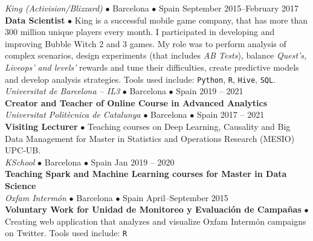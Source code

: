 \documentclass[a4paper, oneside]{scrreprt}
\begin{document}
\vspace{-0.3cm}
\noindent{}
\hspace{-0.15cm}\textit{King (Activision/Blizzard)} $\bullet$ 
Barcelona $\bullet$ Spain \hfill September 2015--February 2017\\
\noindent\textbf{\small Data Scientist } $\bullet$ 
{\small King is a successful mobile game company, that has more
  than 300 million unique players every month. I participated in developing and
  improving Bubble Witch 2 and 3 games. My
  role was to perform analysis of complex scenarios,
  design experiments (that includes \textit{AB Tests}),
  balance \textit{Quest's, Liveops' and levels'}
  rewards and tune their difficulties,
  create predictive models and develop analysis strategies.
  Tools used include: \texttt{Python}, \texttt{R}, \texttt{Hive}, \texttt{SQL}. }\\

\vspace{-0.3cm}
\noindent{}\textit{Universitat de Barcelona -- IL3} $\bullet$ 
Barcelona $\bullet$ Spain \hfill 2019 -- 2021\\
\noindent\textbf{\small Creator and Teacher of Online Course in Advanced Analytics} \\

\vspace{-0.3cm}
\noindent{}\textit{Universitat Politècnica de Catalunya} $\bullet$ 
Barcelona $\bullet$ Spain \hfill 2017 -- 2021\\
\noindent\textbf{\small Visiting Lecturer} $\bullet$ Teaching courses on Deep Learning, Causality and
Big Data Management for Master in Statistics and Operations Research (MESIO) UPC-UB. \\

\vspace{-0.3cm}
\noindent{}\textit{KSchool} $\bullet$ 
Barcelona $\bullet$ Spain \hfill Jan 2019 -- 2020\\
\noindent\textbf{\small Teaching Spark and Machine Learning courses for Master in Data Science} \\

\vspace{-0.3cm}
\noindent{}\textit{Oxfam Intermón} $\bullet$ 
Barcelona $\bullet$ Spain \hfill April--September 2015\\
\noindent\textbf{\small Voluntary Work for Unidad de Monitoreo y Evaluación de Campañas} $\bullet$ 
{\small Creating web application that analyzes and visualize Oxfam Intermón
  campaigns on Twitter.  Tools used
  include: \texttt{R}}\\
\end{document}
